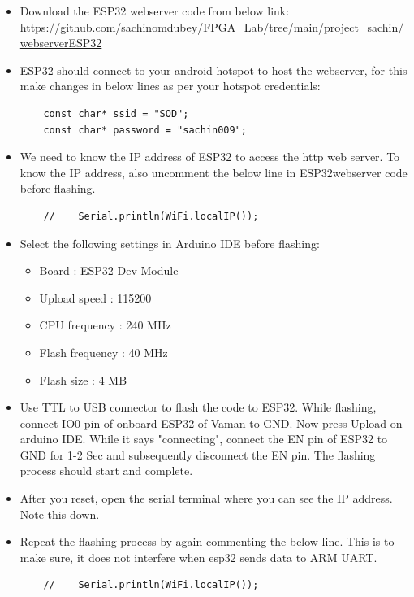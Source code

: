\documentclass[journal,12pt,twocolumn]{IEEEtran}
\begin{document}
\begin{itemize}
    \item Download the ESP32 webserver code from below link:\\
    \url{https://github.com/sachinomdubey/FPGA_Lab/tree/main/project_sachin/webserverESP32}
    \item ESP32 should connect to your android hotspot to host the webserver, for this make changes in below lines as per your hotspot credentials:
    \begin{lstlisting}
    const char* ssid = "SOD";
    const char* password = "sachin009";
    \end{lstlisting}
    \item We need to know the IP address of ESP32 to access the http web server. To know the IP address, also uncomment the below line in ESP32webserver code before flashing.
    \begin{lstlisting}
    //    Serial.println(WiFi.localIP());
    \end{lstlisting}
    \item Select the following settings in Arduino IDE before flashing:
    \begin{itemize}
        \item Board : ESP32 Dev Module
        \item Upload speed : 115200
        \item CPU frequency : 240 MHz
        \item Flash frequency : 40 MHz
        \item Flash size : 4 MB
    \end{itemize}
    \item Use TTL to USB connector to flash the code to ESP32. While flashing, connect IO0 pin of onboard ESP32 of Vaman to GND. Now press Upload on arduino IDE. While it says "connecting", connect the EN pin of ESP32 to GND for 1-2 Sec and subsequently disconnect the EN pin. The flashing process should start and complete.
    \item  After you reset, open the serial terminal where you can see the IP address. Note this down. 
    \item Repeat the flashing process by again commenting the below line. This is to make sure, it does not interfere when esp32 sends data to ARM UART.
    \begin{lstlisting}
    //    Serial.println(WiFi.localIP());
    \end{lstlisting}
\end{itemize}
\end{document}
